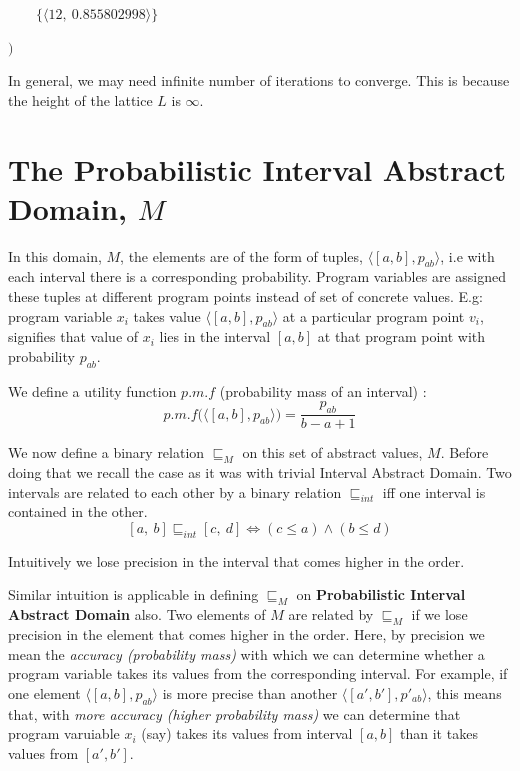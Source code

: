 \documentclass[final,3p, review, times]{Elsevier/elsarticle}
\begin{document}
$\qquad\Big\{\big\langle 12,\ 0.855802998\big\rangle\Big\}
$

$\bigg)$

In general, we may need infinite number of iterations to converge. This is because the height of the lattice $L$ is $\infty$.


\section{The Probabilistic Interval Abstract Domain, $M$}

In this domain, $M$, the elements are of the form of tuples, $\langle[a,b],p_{ab}\rangle$, i.e with each interval there is a corresponding probability. Program variables are assigned these tuples at different program points instead of set of concrete values. E.g: program variable $x_i$ takes value $\langle[a,b],p_{ab}\rangle$ at a particular program point $v_i$, signifies that value of $x_i$ lies in the interval $[a,b]$ at that program point with probability $p_{ab}$.

We define a utility function \underline{$\mathit{p.m.f}$} (probability mass of an interval) :
\begin{equation}
\label{eq:pmf}
p.m.f\Big(\langle[a,b],p_{ab}\rangle\Big)=\frac{p_{ab}}{b-a+1}
\end{equation}

We now define a binary relation $\sqsubseteq_M$ on this set of abstract values, $M$. Before doing that we recall the case as it was with trivial Interval Abstract Domain\cite{nielson99}. Two intervals are related to each other by a binary relation $\sqsubseteq_{int}$ iff one interval is contained in the other.
\begin{equation}\label{eq:interval_def}
[a,\ b]\sqsubseteq_{int}[c,\ d]\iff (c\leq a)\land (b\leq d)
\end{equation}

Intuitively we lose precision in the interval that comes higher in the order.

Similar intuition is applicable in defining $\sqsubseteq_M$ on \textbf{Probabilistic Interval Abstract Domain} also. Two elements of $M$ are related by $\sqsubseteq_M$ if we lose precision in the element that comes higher in the order. Here, by precision we mean the \textit{accuracy (probability mass)} with which we can determine whether a program variable takes its values from the corresponding interval. For example, if one element $\langle[a,b],p_{ab}\rangle$ is more precise than another $\langle[a',b'],p'_{ab}\rangle$, this means that, with \textit{more accuracy (higher probability mass)} we can determine that program varuiable $x_i$ (say) takes its values from interval $[a,b]$ than it takes values from $[a',b']$.
\end{document}
